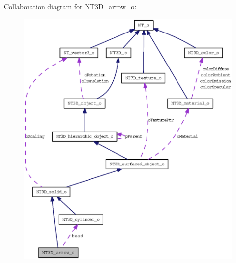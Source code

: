 Collaboration diagram for NT3D\_\-arrow\_\-o:
\nopagebreak
\begin{figure}[H]
\begin{center}
\leavevmode
\includegraphics[width=400pt]{class_n_t3_d__arrow__o__coll__graph}
\end{center}
\end{figure}
